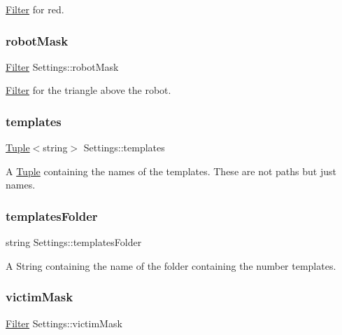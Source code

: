 \mbox{\hyperlink{class_filter}{Filter}} for red. 

\mbox{\label{class_settings_aa814fd0ce673e73de3442e5bf5a26fc6}} 
\subsubsection{\texorpdfstring{robotMask}{robotMask}}
{\footnotesize\ttfamily \mbox{\hyperlink{class_filter}{Filter}} Settings\+::robot\+Mask}



\mbox{\hyperlink{class_filter}{Filter}} for the triangle above the robot. 

\mbox{\label{class_settings_add9f0e9a114013a3295ba056e19d991f}} 
\subsubsection{\texorpdfstring{templates}{templates}}
{\footnotesize\ttfamily \mbox{\hyperlink{class_tuple}{Tuple}}$<$string$>$ Settings\+::templates}



A \mbox{\hyperlink{class_tuple}{Tuple}} containing the names of the templates. These are not paths but just names. 

\mbox{\label{class_settings_a3c272482637bc9c3a534e08e75157830}} 
\subsubsection{\texorpdfstring{templatesFolder}{templatesFolder}}
{\footnotesize\ttfamily string Settings\+::templates\+Folder}



A String containing the name of the folder containing the number templates. 

\mbox{\label{class_settings_ad77dc9d3ebdc000309f1279bc0f9e1ea}} 
\subsubsection{\texorpdfstring{victimMask}{victimMask}}
{\footnotesize\ttfamily \mbox{\hyperlink{class_filter}{Filter}} Settings\+::victim\+Mask}



